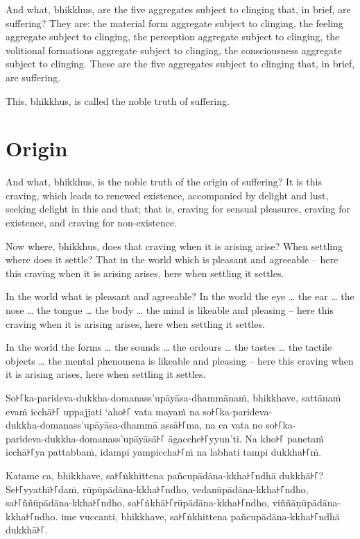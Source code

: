 And what, bhikkhus, are the five aggregates subject to clinging that, in brief,
are suffering? They are: the material form aggregate subject to clinging, the
feeling aggregate subject to clinging, the perception aggregate subject to
clinging, the volitional formations aggregate subject to clinging, the
consciousness aggregate subject to clinging. These are the five aggregates
subject to clinging that, in brief, are suffering.

This, bhikkhus, is called the noble truth of suffering.

\section{Origin}

And what, bhikkhus, is the noble truth of the origin of suffering? It is this
craving, which leads to renewed existence, accompanied by delight and lust,
seeking delight in this and that; that is, craving for sensual pleasures,
craving for existence, and craving for non-existence.

Now where, bhikkhus, does that craving when it is arising arise? When settling
where does it settle? That in the world which is pleasant and agreeable -- here
this craving when it is arising arises, here when settling it settles.

In the world what is pleasant and agreeable? In the world the eye \ldots{} the
ear \ldots{} the nose \ldots{} the tongue \ldots{} the body \ldots{} the mind is
likeable and pleasing -- here this craving when it is arising arises, here when
settling it settles.

In the world the forms \ldots{} the sounds \ldots{} the ordours \ldots{} the
tastes \ldots{} the tactile objects \ldots{} the mental phenomena is likeable
and pleasing -- here this craving when it is arising arises, here when settling
it settles.

\paliPage

So꜔꜒ka-parideva-dukkha-domanass'upāyāsa-dhammānaṁ, bhikkhave, sattānaṁ evaṁ icchā꜔꜒
uppajjati ‘aho꜔꜒ vata mayaṁ na so꜔꜒ka-parideva-\\
dukkha-domanass'upāyāsa-dhammā assā꜔꜒ma, na ca vata no so꜔꜒ka-\\
parideva-dukkha-domanass'upāyāsā꜔꜒ āgacche꜔꜒yyun’ti. Na kho꜔꜒ panetaṁ icchā꜔꜒ya
pattabbaṁ, idampi yampiccha꜔꜒ṁ na labhati tampi dukkha꜔꜒ṁ.

Katame ca, bhikkhave, sa꜔꜒ṅkhittena pañcupādāna-kkha꜔꜒ndhā dukkhā꜔꜒? Se꜔꜒yyathī꜔꜒daṁ,
rūpūpādāna-kkha꜔꜒ndho, vedanūpādāna-kkha꜔꜒ndho, sa꜔꜒ññūpādāna-kkha꜔꜒ndho,
sa꜔꜒ṅkhā꜔꜒rūpādāna-kkha꜔꜒ndho, viññāṇūpādāna-kkha꜔꜒ndho. ime vuccanti, bhikkhave,
sa꜔꜒ṅkhittena pañcupādāna-kkha꜔꜒ndhā dukkhā꜔꜒.

